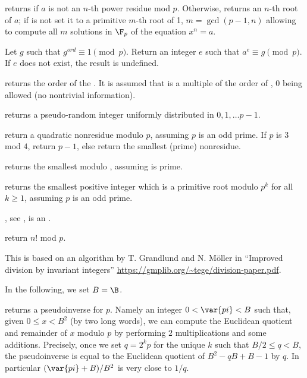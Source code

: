 returns  if $a$ is not an $n$-th power residue mod $p$.
Otherwise, returns an $n$-th root of $a$; if  is not 
set it to a primitive $m$-th root of 1, $m = \gcd(p-1,n)$ allowing to compute
all $m$ solutions in $\F_p$ of the equation $x^n = a$.

 Let $g$ such that
$g^{ord} \equiv 1 \pmod{p}$. Return an integer $e$ such that
$a^e \equiv g \pmod{p}$. If $e$ does not exist, the result is undefined.

 returns the order of the
 . It is assumed that  is a multiple of the order of
, $0$ being allowed (no nontrivial information).

 returns a pseudo-random integer uniformly
distributed in $0, 1, \dots p-1$.

 return a quadratic nonresidue modulo $p$,
assuming $p$ is an odd prime. If $p$ is $3$ mod $4$, return $p-1$, else
return the smallest (prime) nonresidue.

 returns the smallest 
modulo , assuming  is prime.

 returns the smallest positive integer which is
a primitive root modulo $p^k$ for all $k \ge 1$, assuming $p$ is an odd prime.

, see ,
 is an .

 return $n!$ mod $p$.


This is based on an algorithm by T. Grandlund and N. M\"{o}ller in
``Improved division by invariant integers''
\url{https://gmplib.org/~tege/division-paper.pdf}.

In the following, we set $B=\B$.

 returns a pseudoinverse  for $p$.
Namely an integer $0 < \var{pi} < B$ such that, given $0 \leq x < B^2$ (by
two long words), we can compute the Euclidean quotient and remainder of $x$
modulo $p$ by performing $2$ multiplications and some additions. Precisely,
once we set $q = 2^k p$ for the unique $k$ such that $B/2 \leq q < B$, the
pseudoinverse  is equal to the Euclidean quotient of $B^2 - qB + B-1$
by $q$. In particular $(\var{pi} + B) / B^2$ is very close to $1/q$.

